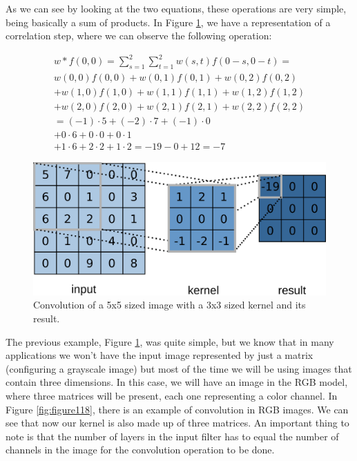 As we can see by looking at the two equations, these operations are very simple, being basically a sum of products. In Figure \ref{fig:figure117}, we have a representation of a correlation step, where we can observe the following operation:

\begin{equation}
\begin{split}
w*f(0,0)=\sum_{s=1}^{2}\sum_{t=1}^{2}w(s,t){f}(0-s,0-t)= \\
w(0,0)f(0,0)+w(0,1)f(0,1)+w(0,2)f(0,2) \\
+w(1,0)f(1,0)+w(1,1)f(1,1)+w(1,2)f(1,2) \\
+w(2,0)f(2,0)+w(2,1)f(2,1)+w(2,2)f(2,2)\\
=(-1)\cdot5+(-2)\cdot7+(-1)\cdot0\\
+0\cdot6+0\cdot0+0\cdot1\\
+1\cdot6+2\cdot2+1\cdot2
=-19-0+12=-7
\end{split}
\end{equation}

\begin{figure}
    \centering
    \includegraphics[scale=0.40]{images/figure117.png}
    \caption{Convolution of a 5x5 sized image with a 3x3 sized kernel and its result.}
    \label{fig:figure117}
\end{figure}

The previous example, Figure \ref{fig:figure117}, was quite simple, but we know that in many applications we won't have the input image represented by just a matrix (configuring a grayscale image) but most of the time we will be using images that contain three dimensions. In this case, we will have an image in the RGB model, where three matrices will be present, each one representing a color channel. In Figure \ref{fig:figure118}, there is an example of convolution in RGB images. We can see that now our kernel is also made up of three matrices. An important thing to note is that the number of layers in the input filter has to equal the number of channels in the image for the convolution operation to be done.

